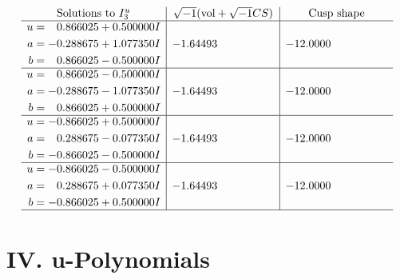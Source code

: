 \documentclass[1p]{elsarticle_modified}
\theoremstyle{definition}
\newcommand{\I}{\sqrt{-1}}
\begin{document}
$$\begin{array}{c|c|c}  
\text{Solutions to }I^u_{3}& \I (\text{vol} + \sqrt{-1}CS) & \text{Cusp shape}\\
 \hline 
\begin{aligned}
u &= \phantom{-}0.866025 + 0.500000 I \\
a &= -0.288675 + 1.077350 I \\
b &= \phantom{-}0.866025 - 0.500000 I\end{aligned}
 & -1.64493\phantom{ +0.000000I} & -12.0000\phantom{ +0.000000I} \\ \hline\begin{aligned}
u &= \phantom{-}0.866025 - 0.500000 I \\
a &= -0.288675 - 1.077350 I \\
b &= \phantom{-}0.866025 + 0.500000 I\end{aligned}
 & -1.64493\phantom{ +0.000000I} & -12.0000\phantom{ +0.000000I} \\ \hline\begin{aligned}
u &= -0.866025 + 0.500000 I \\
a &= \phantom{-}0.288675 - 0.077350 I \\
b &= -0.866025 - 0.500000 I\end{aligned}
 & -1.64493\phantom{ +0.000000I} & -12.0000\phantom{ +0.000000I} \\ \hline\begin{aligned}
u &= -0.866025 - 0.500000 I \\
a &= \phantom{-}0.288675 + 0.077350 I \\
b &= -0.866025 + 0.500000 I\end{aligned}
 & -1.64493\phantom{ +0.000000I} & -12.0000\phantom{ +0.000000I}\\
 \hline 
 \end{array}$$\newpage
\newpage\renewcommand{\arraystretch}{1}
\centering \section*{ IV. u-Polynomials}
\end{document}
